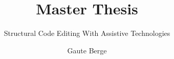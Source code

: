 \documentclass[a4paper,english]{ifimaster}
\title{Master Thesis}
\subtitle{Structural Code Editing With Assistive Technologies}
\author{Gaute Berge}
\begin{document}

\frontmatter{}



\mainmatter{}






\end{document}
